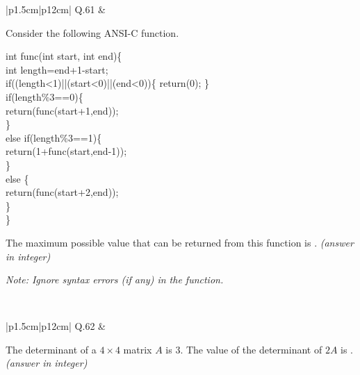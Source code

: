 \documentclass[14pt]{article}
\begin{document}
\begin{tabular}{|p{1.5cm}|p{12cm}|}
\hline
Q.61 &
\parbox[t]{\linewidth}{
Consider the following ANSI-C function.

\vspace{0.3cm}

{\ttfamily
int func(int start, int end)\{\\
\quad int length=end+1-start;\\
\quad if((length<1)||(start<0)||(end<0))\{ return(0); \}\\
\quad if(length\%3==0)\{\\
\qquad return(func(start+1,end));\\
\quad \}\\
\quad else if(length\%3==1)\{\\
\qquad return(1+func(start,end-1));\\
\quad \}\\
\quad else \{\\
\qquad return(func(start+2,end));\\
\quad \}\\
\}
}

The maximum possible value that can be returned from this function is \underline{\hspace{2cm}}. \textit{(answer in integer)}

\vspace{0.3cm}

\textit{Note: Ignore syntax errors (if any) in the function.}
}
\\
\hline
\end{tabular}

\vspace{0.3cm}

\begin{tabular}{|p{1.5cm}|p{12cm}|}
\hline
Q.62 &
\parbox[t]{\linewidth}{
The determinant of a $4 \times 4$ matrix $A$ is 3. The value of the determinant of $2A$ is \underline{\hspace{2cm}}. \textit{(answer in integer)}

\vspace{0.35cm}
}
\\
\hline
\end{tabular}

\vspace{0.3cm}
\end{document}
